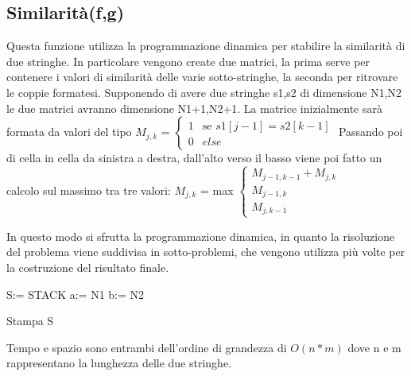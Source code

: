 \documentclass[a4paper,10pt]{article}
\begin{document}
\subsection{Similarità(f,g)}
Questa funzione utilizza la programmazione dinamica per stabilire la similarità di due stringhe. In particolare vengono create due matrici, la prima serve per contenere i valori di similarità delle varie sotto-stringhe, la seconda per ritrovare le coppie formatesi.
Supponendo di avere due stringhe s1,s2 di dimensione N1,N2 le due matrici avranno dimensione N1+1,N2+1. La matrice inizialmente sarà formata da valori del tipo
$M_{j,k}$ = $\left\{\begin{array}{ll}1 & \mbox{se } s1[j-1]=s2[k-1]\\0 & else\end{array}\right.$
Passando poi di cella in cella da sinistra a destra, dall'alto verso il basso viene poi fatto un calcolo sul massimo tra tre valori:
$M_{j,k}$ = max $\left\{\begin{array}{l}M_{j-1,k-1}+M_{j,k}\\M_{j-1,k}\\M_{j,k-1}\end{array}\right.$

In questo modo si sfrutta la programmazione dinamica, in quanto la risoluzione del problema viene suddivisa in sotto-problemi, che vengono utilizza più volte per la costruzione del risultato finale.

\begin{algorithm}[H]

S:= STACK\;
a:= N1\;
b:= N2\;

Stampa S\;
\end{algorithm}
Tempo e spazio sono entrambi dell'ordine di grandezza di $O(n*m)$ dove n e m rappresentano la lunghezza delle due stringhe.
\end{document}
